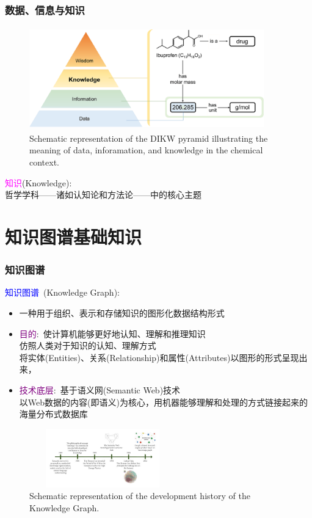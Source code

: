 \frame
{
	\frametitle{数据、信息与知识}
\begin{figure}[h!]
\centering
\vskip -10pt
\includegraphics[height=1.75in,width=4.00in,viewport=0 0 1490 615,clip]{Figures/DIKW_pyramid-illustrating-data_information-knowledge.png}
\caption{\tiny\textrm{Schematic representation of the DIKW pyramid illustrating the meaning of data, inforamation, and knowledge in the chemical context.\cite{ACR56-128_2023}}}%
\label{Fig:Knowledge-based_system}
\end{figure}
\textcolor{magenta}{知识}\textrm{(Knowledge)}:\\
哲学学科——诸如认知论和方法论——中的核心主题
}

\section{知识图谱基础知识}
\frame
{
	\frametitle{知识图谱}
	\textcolor{blue}{知识图谱}~\textrm{(Knowledge Graph)}:
	\begin{itemize}
		\item 一种用于组织、表示和存储知识的图形化数据结构形式
		\item \textcolor{purple}{目的}:~使计算机能够更好地认知、理解和推理知识\\
			仿照人类对于知识的认知、理解方式\\
			将实体\textrm{(Entities)}、关系\textrm{(Relationship)}和属性\textrm{(Attributes)}以图形的形式呈现出来，
		\item \textcolor{purple}{技术底层}:~基于语义网\textrm{(Semantic Web)}技术\\
			以\textrm{Web}数据的内容(即语义)为核心，用机器能够理解和处理的方式链接起来的海量分布式数据库
	\end{itemize}
\begin{figure}[h!]
\centering
\vskip -8pt
\includegraphics[height=1.00in,width=2.50in,viewport=0 0 160 75,clip]{Figures/Development-history-of-the-knowledge-graph.jpg}
\caption{\tiny\textrm{Schematic representation of the development history of the Knowledge Graph.}}%
\label{Fig:Knowledge-history}
\end{figure}
}

